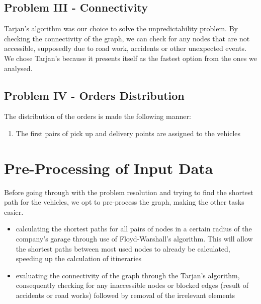 \subsection{Problem III - Connectivity}
Tarjan's algorithm was our choice to solve the unpredictability problem. By checking the connectivity of the graph, we can check for any nodes that are not accessible, supposedly due to road work, accidents or other unexpected events. We chose Tarjan's because it presents itself as the fastest option from the ones we analysed.

\subsection{Problem IV - Orders Distribution}
The distribution of the orders is made the following manner:
\begin{enumerate}
    \item The first pairs of pick up and delivery points are assigned to the vehicles 
\end{enumerate}









\section{Pre-Processing of Input Data}
Before going through with the problem resolution and trying to find the shortest path for the vehicles, we opt to pre-process the graph, making the other tasks easier.

\begin{itemize}
    \item calculating the shortest paths for all pairs of nodes in a certain radius of the company's garage through use of Floyd-Warshall's algorithm. This will allow the shortest paths between most used nodes to already be calculated, speeding up the calculation of itineraries
    \item evaluating the connectivity of the graph through the Tarjan's algorithm, consequently checking for any inaccessible nodes or blocked edges (result of accidents or road works) followed by removal of the irrelevant elements
\end{itemize}







